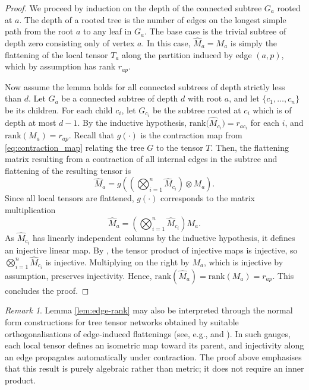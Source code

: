 \documentclass{amsart}
\theoremstyle{plain}
\theoremstyle{definition}
\theoremstyle{remark}
\newtheorem{remark}[theorem]{Remark}
\begin{document}
\begin{proof}
We proceed by induction on the depth of the connected subtree $G_a$ rooted at $a$. The depth of a rooted tree is the number of edges on the longest simple path from the root $a$ to any leaf in $G_a$. The base case is the trivial subtree of depth zero consisting only of vertex $a$. In this case, $\widehat M_a=M_a$ is simply the flattening of the local tensor $T_a$ along the partition induced by edge $(a,p)$, which by assumption has rank $r_{ap}$. 

Now assume the lemma holds for all connected subtrees of depth strictly less than $d$. Let $G_a$ be a connected subtree of depth $d$ with root $a$, and let $\{c_1,\dots, c_n\}$ be its children. For each child $c_i$, let $G_{c_i}$ be the subtree rooted at $c_i$ which is of depth at most $d-1$. By the inductive hypothesis, $\mathrm{rank}\bigl(\widehat M_{c_i}\bigr)=r_{ac_i}$ for each $i$, and $\mathrm{rank}\left( M_a\right)=r_{ap}$. Recall that $g(\cdot)$ is the contraction map from \eqref{eq:contraction_map} relating the tree $G$ to the tensor $T$. Then, the flattening matrix resulting from a contraction of all internal edges in the subtree and flattening of the resulting tensor is
\[
    \widehat M_a = g\left(\left(\bigotimes_{i=1}^n \widehat M_{c_i}\right) \otimes  M_a\right).
\]
Since all local tensors are flattened, $g(\cdot)$ corresponds to the matrix multiplication
\[
        \widehat M_a = \left(\bigotimes_{i=1}^n \widehat M_{c_i}\right)  M_a.
\]
As $\widehat M_{c_i}$ has linearly independent columns by the inductive hypothesis, it defines an injective linear map. By \cite[equation 1.12]{Greub1978}, the tensor product of injective maps is injective, so $\bigotimes_{i=1}^n \widehat M_{c_i}$ is injective. Multiplying on the right by $M_a$, which is injective by assumption, preserves injectivity. Hence, $\mathrm{rank}(\widehat M_a)=\mathrm{rank}(M_a)=r_{ap}$. This concludes the proof. 
\end{proof}


\begin{remark}
Lemma \ref{lem:edge-rank} may also be interpreted through the normal form constructions for tree tensor networks obtained by suitable orthogonalisations of edge-induced flattenings (see, e.g., \cite[Section 11.3.2]{hackbusch2019tensor} and \cite{grasedyckIntroductionHierarchicalRank2011, Grasedyck2024}). In such gauges, each local tensor defines an isometric map toward its parent, and injectivity along an edge propagates automatically under contraction. The proof above emphasises that this result is purely algebraic rather than metric; it does not require an inner product.
\end{remark}
\end{document}
